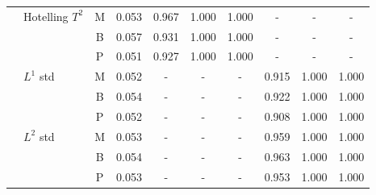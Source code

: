 \begin{tabular*}{\textwidth}{@{\extracolsep\fill}
l
>{\raggedright\arraybackslash}p{3.2cm}
c
*{7}{S[table-format=1.3]}
@{}}
\midrule
 & Hotelling $T^{2}$ & M & 0.053 & 0.967 & 1.000 & 1.000 & - & - & - \\
 &  & B & 0.057 & 0.931 & 1.000 & 1.000 & - & - & - \\
 &  & P & 0.051 & 0.927 & 1.000 & 1.000 & - & - & - \\
 & $L^{1}$ std & M & 0.052 & - & - & - & 0.915 & 1.000 & 1.000 \\
 &  & B & 0.054 & - & - & - & 0.922 & 1.000 & 1.000 \\
 &  & P & 0.052 & - & - & - & 0.908 & 1.000 & 1.000 \\
 & $L^{2}$ std & M & 0.053 & - & - & - & 0.959 & 1.000 & 1.000 \\
 &  & B & 0.054 & - & - & - & 0.963 & 1.000 & 1.000 \\
 &  & P & 0.053 & - & - & - & 0.953 & 1.000 & 1.000 \\
\bottomrule
\end{tabular*}
